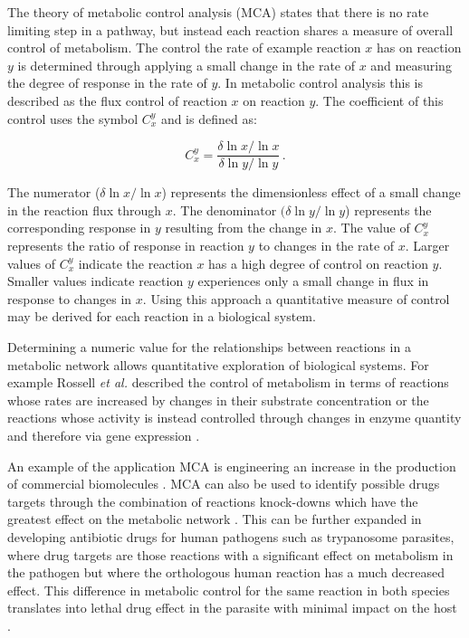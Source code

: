 The theory of metabolic control analysis (MCA) \cite{fell1992,fell1997} states that there is no rate limiting step in a pathway, but instead each reaction shares a measure of overall control of metabolism. The control the rate of example reaction $x$ has on reaction $y$ is determined through applying a small change in the rate of $x$ and measuring the degree of response in the rate of $y$. In metabolic control analysis this is described as the flux control of reaction $x$ on reaction $y$. The coefficient of this control uses the symbol $C_{x}^{y}$ and is defined as:

\begin{equation}\label{fcc}
C_{x}^{y} = \frac{ \delta \ln x / \ln x}{\delta \ln y / \ln y} \, .
\end{equation}

The numerator ($\delta \ln x / \ln x$) represents the dimensionless effect of a small change in the reaction flux through $x$. The denominator $(\delta \ln y / \ln y$) represents the corresponding response in $y$ resulting from the change in $x$. The value of $C_{x}^{y}$ represents the ratio of response in reaction $y$ to changes in the rate of $x$. Larger values of $C_{x}^{y}$ indicate the reaction $x$ has a high degree of control on reaction $y$. Smaller values indicate reaction $y$ experiences only a small change in flux in response to changes in $x$. Using this approach a quantitative measure of control may be derived for each reaction in a biological system.

Determining a numeric value for the relationships between reactions in a metabolic network allows quantitative exploration of biological systems. For example Rossell \emph{et al.} described the control of metabolism in terms of reactions whose rates are increased by changes in their substrate concentration or the reactions whose activity is instead controlled through changes in enzyme quantity and therefore via gene expression \cite{rossell2006,daran-lapujade2007}.

An example of the application MCA is engineering an increase in the production of commercial biomolecules \cite{niederberger1992}. MCA can also be used to identify possible drugs targets through the combination of reactions knock-downs which have the greatest effect on the metabolic network \cite{lehar2008,hopkins2008}. This can be further expanded in developing antibiotic drugs for human pathogens such as trypanosome parasites, where drug targets are those reactions with a significant effect on metabolism in the pathogen but where the orthologous human reaction has a much decreased effect. This difference in metabolic control for the same reaction in both species translates into lethal drug effect in the parasite with minimal impact on the host \cite{hornberg2007}.

